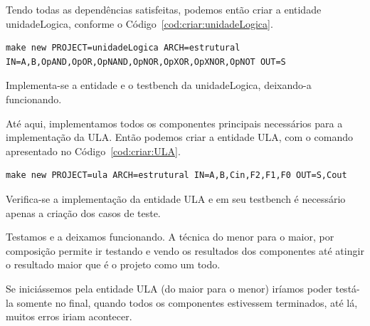 \documentclass[a4paper,11pt]{report}
\begin{document}
Tendo todas as dependências satisfeitas, podemos então criar a entidade unidadeLogica, conforme o Código~\ref{cod:criar:unidadeLogica}.

\lstset{numbers=left, numberstyle=\tiny, stepnumber=1, numbersep=3pt}
\begin{lstlisting}[label=cod:criar:unidadeLogica,caption=Comando para a criar a entidade unidadeLogica.]
  make new PROJECT=unidadeLogica ARCH=estrutural IN=A,B,OpAND,OpOR,OpNAND,OpNOR,OpXOR,OpXNOR,OpNOT OUT=S
\end{lstlisting}

Implementa-se a entidade e o testbench da unidadeLogica, deixando-a funcionando.


Até aqui, implementamos todos os componentes principais necessários para a implementação da ULA. Então podemos criar a entidade ULA, com o comando apresentado no Código~\ref{cod:criar:ULA}.

\lstset{numbers=left, numberstyle=\tiny, stepnumber=1, numbersep=3pt}
\begin{lstlisting}[label=cod:criar:ULA,caption=Comando para a criar a entidade ULA.]
  make new PROJECT=ula ARCH=estrutural IN=A,B,Cin,F2,F1,F0 OUT=S,Cout
\end{lstlisting}

Verifica-se a implementação da entidade ULA e em seu testbench é necessário apenas a criação dos casos de teste. 


Testamos e a deixamos funcionando.
A técnica do menor para o maior, por composição permite ir testando e vendo os resultados dos componentes até atingir o resultado maior que é o projeto como um todo.

Se iniciássemos pela entidade ULA (do maior para o menor) iríamos poder testá-la somente no final, quando todos os componentes estivessem terminados, até lá, muitos erros iriam acontecer.
\end{document}
